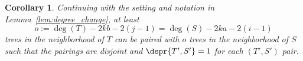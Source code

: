\documentclass[11pt,onecolumn,conference]{IEEEtran}
\newtheorem{corollary}[theorem]{Corollary}
\newcommand{\cuttable}[2][]{%
    \ifthenelse{\equal{#1}{}}%
		{}%
		{#1}%
}
\begin{document}
\begin{corollary}
\label{cor:paired_neighbors}
Continuing with the setting and notation in Lemma~\ref{lem:degree_change}, at least
$$o := \deg(T) - 2kb - 2(j-1) = \deg(S) - 2ka - 2(i-1)$$
trees in the neighborhood of $T$ can be paired with $o$ trees in the neighborhood of $S$ such that the pairings are disjoint and $\dspr{T',S'} = 1$ for each $(T',S')$ pair.
\end{corollary}
\cuttable{
\begin{proof}
By the same arguments as in the proof of Lemma~\ref{lem:degree_change}, $o$ rSPR moves can be applied to $T$ and $S$ with the same source and target nodes.
For each such $(T',S')$ pair, we can move $R$ in either tree to obtain the other member of the pair.
\end{proof}
}
\end{document}
